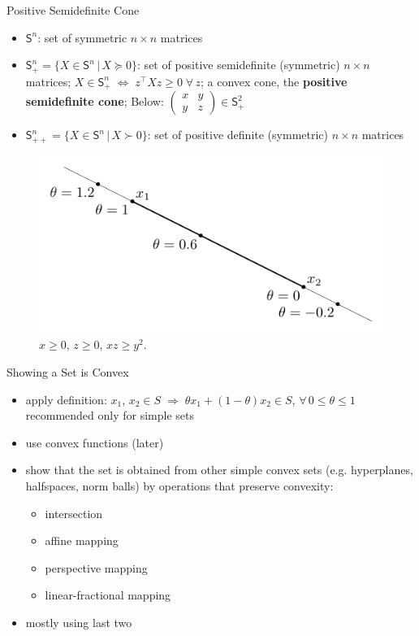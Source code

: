\documentclass[10pt,handout]{beamer}
\newcommand{\ds}{\displaystyle}
\newcommand{\ie}{\;\Longrightarrow\;}
\newcommand{\ifff}{\;\Longleftrightarrow\;}
\theoremstyle{definition}
\begin{document}
\begin{frame}{Positive Semidefinite Cone}
  \begin{itemize}
    \item $\mathsf{S}^n$: set of symmetric $n\times n$ matrices
    \item $\ds\mathsf{S}^n_+ = \{X\in\mathsf{S}^n\,|\,X\succcurlyeq 0\}$: set of positive semidefinite (symmetric) $n\times n$ matrices; $\ds X\in\mathsf{S}^n_+ \ifff z^\top X z\geqslant 0\;\forall\,z$; a convex cone, the {\bf positive semidefinite cone}; Below: $\ds\begin{pmatrix}x & y \\ y & z\end{pmatrix}\in\mathsf{S}^2_+$
    \item $\ds\mathsf{S}^n_{++} = \{X\in\mathsf{S}^n\,|\,X\succ 0\}$: set of positive definite (symmetric) $n\times n$ matrices
  \end{itemize}
  \begin{figure}[!htbp]
    \centering
    \includegraphics[scale=0.6,page=12]{fig/note06/02.pdf}
    \caption{$x\geqslant 0$, $z\geqslant 0$, $xz\geqslant y^2$.}
  \end{figure}
\end{frame}

\begin{frame}{Showing a Set is Convex}
  \begin{itemize}
    \item apply definition: $x_1$, $x_2\in S\ie \theta x_1 + (1 - \theta)x_2\in S$, $\forall\,0\leqslant\theta\leqslant 1$ \\ recommended only for simple sets
    \item use convex functions (later)
    \item show that the set is obtained from other simple convex sets (e.g. hyperplanes, halfspaces, norm balls) by operations that preserve convexity:
      \begin{itemize}
        \item intersection
        \item affine mapping
        \item perspective mapping
        \item linear-fractional mapping
      \end{itemize}
    \item mostly using last two
  \end{itemize}
\end{frame}
\end{document}
